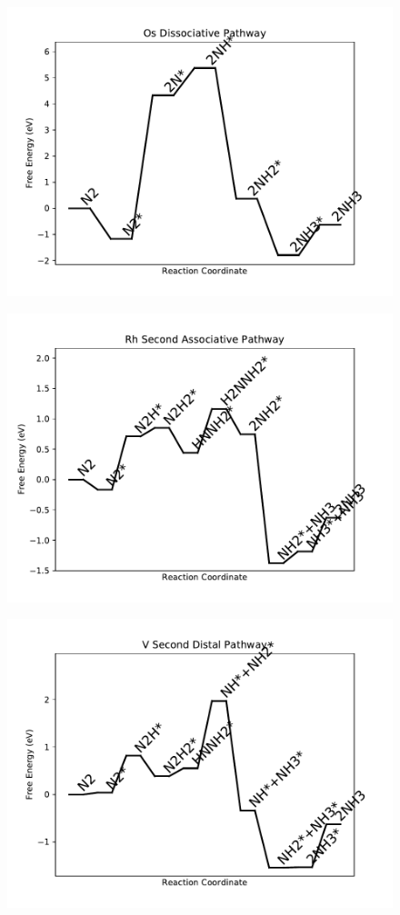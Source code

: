 \begin{figure}
\includegraphics[width=0.8\linewidth]{data/plots/Os_dissociative.pdf}
\end{figure}

\begin{figure}
\includegraphics[width=0.8\linewidth]{data/plots/Rh_associative_2.pdf}
\end{figure}

\begin{figure}
\includegraphics[width=0.8\linewidth]{data/plots/V_distal_2.pdf}
\end{figure}

